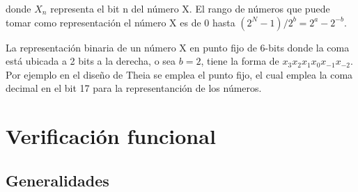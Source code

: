 donde $X_n$ representa el bit n del número X. El rango de números que puede tomar como representación el número X es de 0 hasta $(2^{N}-1)/2^{b}=2^{a}-2^{-b}$.

La representación binaria de un número X en punto fijo de 6-bits donde la coma está ubicada a 2 bits a la derecha, o sea $b=2$, tiene la forma de $x_{3}x_{2}x_{1}x_{0}x_{-1}x_{-2}$. Por ejemplo en el diseño de Theia se emplea el punto fijo, el cual emplea la coma decimal en el bit 17 para la representanción de los números.










\section{Verificación funcional}

\subsection{Generalidades}

